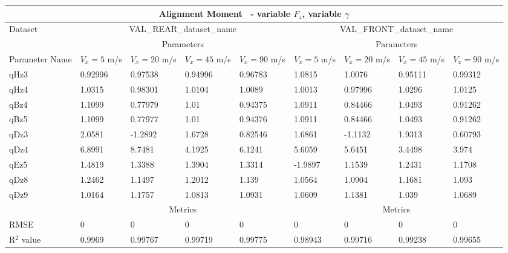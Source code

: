         \begin{tabular}{lllll|llll} \hline \multicolumn{9}{c}{Alignment Moment~ - variable $F_z$, variable $\gamma$}                                                                                                                                                                        \\ \hline Dataset                         & \multicolumn{4}{c|}{VAL\_REAR\_dataset\_name}                                                & \multicolumn{4}{c}{VAL\_FRONT\_dataset\_name}                                                     \\ \hline \multicolumn{1}{c}{}            & \multicolumn{4}{c|}{Parameters}                                                              & \multicolumn{4}{c}{Parameters}                                                                    \\ \hline Parameter Name                  & $V_x = 5$ m/s     & $V_x = 20$ m/s     & $V_x = 45$ m/s     & $V_x = 90$ m/s     & $V_x = 5$ m/s      & $V_x = 20$ m/s      & $V_x = 45$ m/s      & $V_x = 90$ m/s       \\ qHz3                            & 0.92996 & 0.97538 & 0.94996 & 0.96783 & 1.0815 & 1.0076 & 0.95111 & 0.99312  \\ qHz4                            & 1.0315 & 0.98301 & 1.0104 & 1.0089 & 1.0013 & 0.97996 & 1.0296 & 1.0125  \\ qBz4                            & 1.1099 & 0.77979 & 1.01 & 0.94375 & 1.0911 & 0.84466 & 1.0493 & 0.91262  \\ qBz5                            & 1.1099 & 0.77977 & 1.01 & 0.94376 & 1.0911 & 0.84466 & 1.0493 & 0.91262  \\ qDz3                            & 2.0581 & -1.2892 & 1.6728 & 0.82546 & 1.6861 & -1.1132 & 1.9313 & 0.60793  \\ qDz4                            & 6.8991 & 8.7481 & 4.1925 & 6.1241 & 5.6059 & 5.6451 & 3.4498 & 3.974  \\ qEz5                            & 1.4819 & 1.3388 & 1.3904 & 1.3314 & -1.9897 & 1.1539 & 1.2431 & 1.1708  \\ qDz8                           & 1.2462 & 1.1497 & 1.2012 & 1.139 & 1.0564 & 1.0904 & 1.1681 & 1.093 \\ qDz9                            & 1.0164 & 1.1757 & 1.0813 & 1.0931 & 1.0609 & 1.1381 & 1.039 & 1.0689  \\ \hline \multicolumn{1}{c|}{}           & \multicolumn{4}{c|}{Metrics}                                                                 & \multicolumn{4}{c}{Metrics}                                                                       \\ \hline RMSE                            & 0 & 0 & 0 & 0 & 0 & 0 & 0 & 0  \\ R$^2$ value                       & 0.9969   & 0.99767   & 0.99719   & 0.99775   & 0.98943   & 0.99716   & 0.99238   & 0.99655    \\ \hline \end{tabular} 